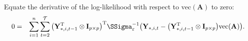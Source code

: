 \documentclass[a4paper]{article}
\theoremstyle{myexamplestyle}
\begin{document}
Equate the derivative of the log-likelihood with respect to $\mbox{vec}(\mathbf{A})$ to zero:
\begin{eqnarray*}
0 & = & \sum_{i=1}^n \sum_{t=2}^{\mathcal{T}} \big( \mathbf{Y}_{\ast,i,t-1}^{\mathrm{T}}  \otimes \mathbf{I}_{p \times p} \big)^{\mathrm{T}}  \SSigma_{\varepsilon}^{-1}
\big(\mathbf{Y}_{\ast,i,t} - \big( \mathbf{Y}_{\ast,i,t-1}^{\mathrm{T}}  \otimes \mathbf{I}_{p \times p} \big) \mbox{vec}(\mathbf{A}) \big).

\end{eqnarray*}
\end{document}
